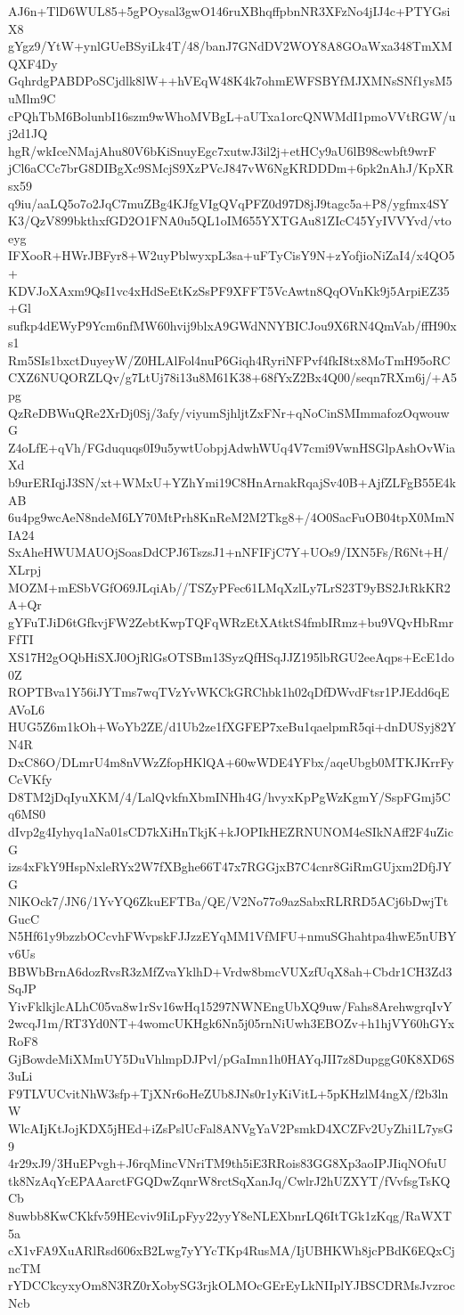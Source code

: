 AJ6n+TlD6WUL85+5gPOysal3gwO146ruXBhqffpbnNR3XFzNo4jIJ4c+PTYGsiX8
gYgz9/YtW+ynlGUeBSyiLk4T/48/banJ7GNdDV2WOY8A8GOaWxa348TmXMQXF4Dy
GqhrdgPABDPoSCjdlk8lW++hVEqW48K4k7ohmEWFSBYfMJXMNsSNf1ysM5uMlm9C
cPQhTbM6BolunbI16szm9wWhoMVBgL+aUTxa1orcQNWMdI1pmoVVtRGW/uj2d1JQ
hgR/wkIceNMajAhu80V6bKiSnuyEgc7xutwJ3il2j+etHCy9aU6lB98cwbft9wrF
jCl6aCCc7brG8DIBgXc9SMcjS9XzPVcJ847vW6NgKRDDDm+6pk2nAhJ/KpXRsx59
q9iu/aaLQ5o7o2JqC7muZBg4KJfgVIgQVqPFZ0d97D8jJ9tagc5a+P8/ygfmx4SY
K3/QzV899bkthxfGD2O1FNA0u5QL1oIM655YXTGAu81ZIcC45YyIVVYvd/vtoeyg
IFXooR+HWrJBFyr8+W2uyPblwyxpL3sa+uFTyCisY9N+zYofjioNiZaI4/x4QO5+
KDVJoXAxm9QsI1vc4xHdSeEtKzSsPF9XFFT5VcAwtn8QqOVnKk9j5ArpiEZ35+Gl
sufkp4dEWyP9Ycm6nfMW60hvij9blxA9GWdNNYBICJou9X6RN4QmVab/ffH90xs1
Rm5SIs1bxctDuyeyW/Z0HLAlFol4nuP6Giqh4RyriNFPvf4fkI8tx8MoTmH95oRC
CXZ6NUQORZLQv/g7LtUj78i13u8M61K38+68fYxZ2Bx4Q00/seqn7RXm6j/+A5pg
QzReDBWuQRe2XrDj0Sj/3afy/viyumSjhljtZxFNr+qNoCinSMImmafozOqwouwG
Z4oLfE+qVh/FGduquqs0I9u5ywtUobpjAdwhWUq4V7cmi9VwnHSGlpAshOvWiaXd
b9urERIqjJ3SN/xt+WMxU+YZhYmi19C8HnArnakRqajSv40B+AjfZLFgB55E4kAB
6u4pg9wcAeN8ndeM6LY70MtPrh8KnReM2M2Tkg8+/4O0SacFuOB04tpX0MmNIA24
SxAheHWUMAUOjSoasDdCPJ6TszsJ1+nNFIFjC7Y+UOs9/IXN5Fs/R6Nt+H/XLrpj
MOZM+mESbVGfO69JLqiAb//TSZyPFec61LMqXzlLy7LrS23T9yBS2JtRkKR2A+Qr
gYFuTJiD6tGfkvjFW2ZebtKwpTQFqWRzEtXAtktS4fmbIRmz+bu9VQvHbRmrFfTI
XS17H2gOQbHiSXJ0OjRlGsOTSBm13SyzQfHSqJJZ195lbRGU2eeAqps+EcE1do0Z
ROPTBva1Y56iJYTms7wqTVzYvWKCkGRChbk1h02qDfDWvdFtsr1PJEdd6qEAVoL6
HUG5Z6m1kOh+WoYb2ZE/d1Ub2ze1fXGFEP7xeBu1qaelpmR5qi+dnDUSyj82YN4R
DxC86O/DLmrU4m8nVWzZfopHKlQA+60wWDE4YFbx/aqeUbgb0MTKJKrrFyCcVKfy
D8TM2jDqIyuXKM/4/LalQvkfnXbmINHh4G/hvyxKpPgWzKgmY/SspFGmj5Cq6MS0
dIvp2g4Iyhyq1aNa01sCD7kXiHnTkjK+kJOPIkHEZRNUNOM4eSIkNAff2F4uZicG
izs4xFkY9HspNxleRYx2W7fXBghe66T47x7RGGjxB7C4cnr8GiRmGUjxm2DfjJYG
NlKOck7/JN6/1YvYQ6ZkuEFTBa/QE/V2No77o9azSabxRLRRD5ACj6bDwjTtGucC
N5Hf61y9bzzbOCcvhFWvpskFJJzzEYqMM1VfMFU+nmuSGhahtpa4hwE5nUBYv6Us
BBWbBrnA6dozRvsR3zMfZvaYklhD+Vrdw8bmcVUXzfUqX8ah+Cbdr1CH3Zd3SqJP
YivFklkjlcALhC05va8w1rSv16wHq15297NWNEngUbXQ9uw/Fahs8ArehwgrqIvY
2wcqJ1m/RT3Yd0NT+4womcUKHgk6Nn5j05rnNiUwh3EBOZv+h1hjVY60hGYxRoF8
GjBowdeMiXMmUY5DuVhlmpDJPvl/pGaImn1h0HAYqJII7z8DupggG0K8XD6S3uLi
F9TLVUCvitNhW3sfp+TjXNr6oHeZUb8JNs0r1yKiVitL+5pKHzlM4ngX/f2b3lnW
WlcAIjKtJojKDX5jHEd+iZsPslUcFal8ANVgYaV2PsmkD4XCZFv2UyZhi1L7ysG9
4r29xJ9/3HuEPvgh+J6rqMincVNriTM9th5iE3RRois83GG8Xp3aoIPJIiqNOfuU
tk8NzAqYcEPAAarctFGQDwZqnrW8rctSqXanJq/CwlrJ2hUZXYT/fVvfsgTsKQCb
8uwbb8KwCKkfv59HEcviv9IiLpFyy22yyY8eNLEXbnrLQ6ItTGk1zKqg/RaWXT5a
cX1vFA9XuARlRsd606xB2Lwg7yYYcTKp4RusMA/IjUBHKWh8jcPBdK6EQxCjncTM
rYDCCkcyxyOm8N3RZ0rXobySG3rjkOLMOcGErEyLkNIIplYJBSCDRMsJvzrocNcb
